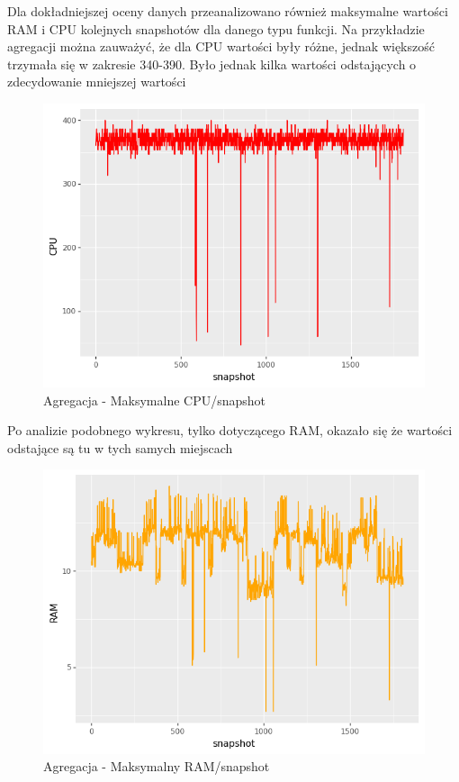Dla dokładniejszej oceny danych przeanalizowano również maksymalne wartości RAM i CPU kolejnych snapshotów dla danego typu funkcji. Na przykładzie agregacji można zauważyć, że dla CPU wartości były różne, jednak większość trzymała się w zakresie 340-390. Było jednak kilka wartości odstających o zdecydowanie mniejszej wartości
\begin{figure}[H]
    \centering
    \captionsetup{justification=centering,margin=0.5cm}
    \includegraphics[scale=0.9]{figures/04-opis-danych/data-analysis/aggregation_max_cpu.png}
    \caption{Agregacja - Maksymalne CPU/snapshot}
    \label{fig:scr46}
\end{figure}
Po analizie podobnego wykresu, tylko dotyczącego RAM, okazało się że wartości odstające są tu w tych samych miejscach
\begin{figure}[H]
    \centering
    \captionsetup{justification=centering,margin=0.5cm}
    \includegraphics[scale=0.9]{figures/04-opis-danych/data-analysis/aggregation_max_ram.png}
    \caption{Agregacja - Maksymalny RAM/snapshot}
    \label{fig:scr46}
\end{figure}
